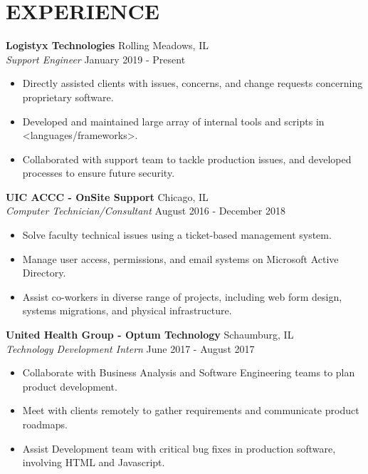 \documentclass[10.99pt]{article}
\begin{document}
\vspace{-0.5em}
\section*{\textbf{EXPERIENCE}}
\noindent\makebox[\linewidth]{\rule{7.2in}{0.4pt}}

\noindent\textbf{Logistyx Technologies} \hfill Rolling Meadows, IL
\\\textit{Support Engineer} \hfill January 2019 - Present
\begin{itemize}
\itemsep0em
\item Directly assisted clients with issues, concerns, and change requests concerning proprietary software.
\item Developed and maintained large array of internal tools and scripts in \textless languages/frameworks\textgreater.
\item Collaborated with support team to tackle production issues, and developed processes to ensure future security.
\end{itemize}

\vspace{0.5em}
\noindent\textbf{UIC ACCC - OnSite Support} \hfill Chicago, IL
\\\textit{Computer Technician/Consultant} \hfill August 2016 - December 2018
\begin{itemize}
\itemsep0em
\item Solve faculty technical issues using a ticket-based management system.
\item Manage user access, permissions, and email systems on Microsoft Active Directory.
\item Assist co-workers in diverse range of projects, including web form design, systems migrations, and physical infrastructure.
\end{itemize}

\vspace{0.5em}
\noindent\textbf{United Health Group - Optum Technology} \hfill Schaumburg, IL
\\\textit{Technology Development Intern} \hfill June 2017 - August 2017
\begin{itemize}
\itemsep0em
\item Collaborate with Business Analysis and Software Engineering teams to plan product development.
\item Meet with clients remotely to gather requirements and communicate product roadmaps.
\item Assist Development team with critical bug fixes in production software, involving HTML and Javascript.
\end{itemize}
\end{document}

